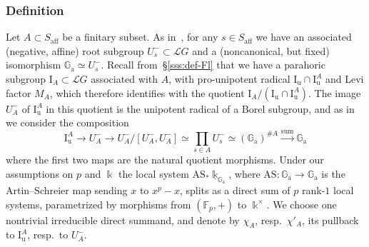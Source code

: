 \documentclass[11pt]{amsart}
\numberwithin{equation}{section}
\theoremstyle{plain}
\theoremstyle{definition}
\newcommand{\I}{{\mathrm I}}
\renewcommand{\k}{\Bbbk}
\newcommand{\sL}{{\mathcal L}}
\newcommand{\Ga}{{\mathbb{G}_{\mathrm{a}}}}
\newcommand{\Ad}{\mathrm{Ad}}
\newcommand{\Phis}{\Phi^{\mathrm{s}}}
\newcommand{\af}{\mathrm{aff}}
\newcommand{\Iu}{\mathrm{I}_{\mathrm{u}}}
\begin{document}
\subsubsection{Definition} 
\label{sss:Whittaker}

Let $A\subset S_\af$ be a finitary subset.
As in~\cite[\S 3.4]{AR23}, for any $s \in S_\af$ we have an associated (negative, affine) root subgroup $U_s^- \subset \sL G$ and a (noncanonical, but fixed) isomorphism $\Ga \simeq U_s^-$.
Recall from~\S\ref{sss:def-Fl} that we have a parahoric subgroup $\I_A \subset \sL G$ associated with $A$, with pro-unipotent radical $\Iu \cap \Iu^A$ and Levi factor $M_A$, which therefore identifies with the quotient $\I_A / (\Iu \cap \Iu^A)$. The image $U_A^-$ of $\Iu^A$ in this quotient is the unipotent radical of a Borel subgroup, and as in~\cite[\S 3.4]{AR23} we consider the composition
\[
\Iu^A \to U_A^- \to U_A^- / [U_A^-, U_A^-] \simeq \prod_{s \in A} U_s^- \simeq (\Ga)^{\# A} \xrightarrow{\mathrm{sum}} \Ga
\]
where the first two maps are the natural quotient morphisms.
Under our assumptions on $p$ and $\k$ the local system $\mathrm{AS}_* \underline{\k}_{\Ga}$, where $\mathrm{AS} : \Ga \to \Ga$ is the Artin--Schreier map sending $x$ to $x^p-x$, splits as a direct sum of $p$ rank-$1$ local systems, parametrized by morphisms from $(\mathbb{F}_p,+)$ to $\k^\times$. We choose one nontrivial irreducible direct summand,
and denote by $\chi_A$, resp.~$\chi'_A$, its pullback to $\Iu^A$, resp.~to $U_A^-$. 
\end{document}
